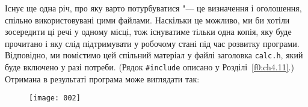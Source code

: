 \documentclass[a4paper,12pt]{book}
\begin{document}
  Існує ще одна річ, про яку варто потурбуватися "--- це визначення і оголошення,
  спільно використовувані цими файлами. Наскільки це можливо, ми би хотіли зосередити ці
  речі у одному місці, тож існуватиме тільки одна копія, яку буде прочитано і яку слід
  підтримувати у робочому стані під час розвитку програми. Відповідно, ми помістимо цей
  спільний матеріал у файлі заголовка \texttt{calc.h}, який буде включено у разі потреби.
  (Рядок \texttt{\#include} описано у Розділі~\ref{f0:ch4.11}.) Отримана в
  результаті програма може виглядати так:
%
%
  \begin{figure}[!htb]
  \centering
  \texttt{[image: 002]}
  \end{figure}
\end{document}
